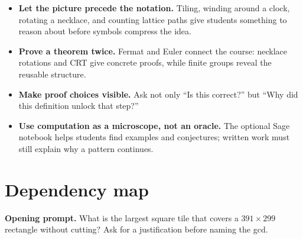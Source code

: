 \begin{itemize}
  \item \textbf{Let the picture precede the notation.} Tiling, winding around a clock, rotating a necklace, and counting lattice paths give students something to reason about before symbols compress the idea.
  \item \textbf{Prove a theorem twice.} Fermat and Euler connect the course: necklace rotations and CRT give concrete proofs, while finite groups reveal the reusable structure.
  \item \textbf{Make proof choices visible.} Ask not only ``Is this correct?'' but ``Why did this definition unlock that step?''
  \item \textbf{Use computation as a microscope, not an oracle.} The optional Sage notebook helps students find examples and conjectures; written work must still explain why a pattern continues.
\end{itemize}

\section*{Dependency map}

\begin{center}
\end{center}

\begin{checkpoint}
\textbf{Opening prompt.} What is the largest square tile that covers a
$391\times299$ rectangle without cutting? Ask for a justification before
naming the gcd.
\end{checkpoint}
